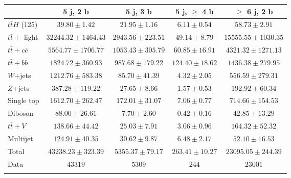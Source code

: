 
\begin{table}
\begin{center}
\begin{tabular}{l*{4}{c}}
\hline\hline
 & 5 j, 2 b & 5 j, 3 b & 5 j, $\geq$ 4 b & $\geq$ 6 j, 2 b\\
\hline
$t\bar{t}H$ (125) & $39.80 \pm 1.42$ & $21.95 \pm 1.16$ & $6.11 \pm 0.54$ & $58.73 \pm 2.91$\\
$t\bar{t}+$ light & $32244.32 \pm 1464.43$ & $2943.56 \pm 223.51$ & $49.14 \pm 8.79$ & $15555.55 \pm 1030.35$\\
$t\bar{t}+c\bar{c}$ & $5564.77 \pm 1706.77$ & $1053.43 \pm 305.79$ & $60.85 \pm 16.91$ & $4321.32 \pm 1271.13$\\
$t\bar{t}+b\bar{b}$ & $1824.72 \pm 360.93$ & $987.68 \pm 179.22$ & $124.40 \pm 18.62$ & $1436.38 \pm 279.95$\\
$W$+jets & $1212.76 \pm 583.38$ & $85.70 \pm 41.39$ & $4.32 \pm 2.05$ & $556.59 \pm 279.31$\\
$Z$+jets & $387.28 \pm 119.22$ & $27.65 \pm 8.66$ & $1.57 \pm 0.53$ & $192.92 \pm 60.34$\\
Single top & $1612.70 \pm 262.47$ & $172.01 \pm 31.07$ & $7.06 \pm 0.77$ & $714.66 \pm 154.53$\\
Diboson & $88.00 \pm 26.61$ & $7.70 \pm 2.60$ & $0.42 \pm 0.16$ & $42.85 \pm 13.29$\\
$t\bar{t}+V$ & $138.66 \pm 44.42$ & $25.03 \pm 7.91$ & $3.06 \pm 0.96$ & $164.32 \pm 52.32$\\
Multijet & $124.91 \pm 40.35$ & $30.62 \pm 9.87$ & $6.48 \pm 2.17$ & $52.10 \pm 16.53$\\
\hline
Total & $43238.23 \pm 323.39$          & $5355.37 \pm 79.17$          & $263.41 \pm 10.27$          & $23095.05 \pm 244.39$         \\
\hline
Data & $43319$ & $5309$ & $244$ & $23001$\\
\hline\hline     \\
\end{tabular}
\vspace{0.1cm}


\end{center}
\end{table}
